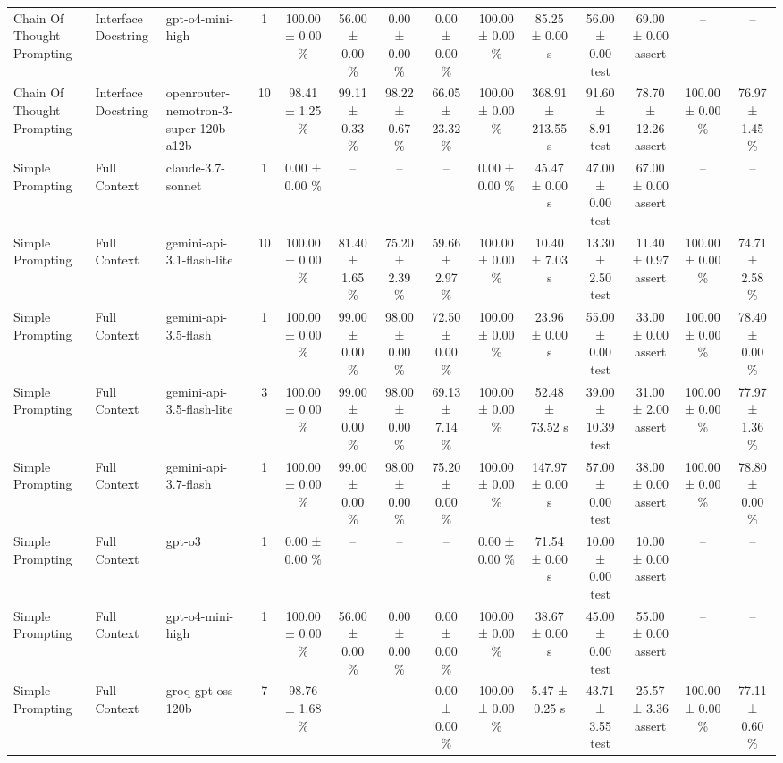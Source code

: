 \begin{table}[htbp]
\begin{tabular}{lllccccccccccc}
Chain Of Thought Prompting & Interface Docstring & gpt-o4-mini-high & 1 & 100.00 ± 0.00 \% & 56.00 ± 0.00 \% & 0.00 ± 0.00 \% & 0.00 ± 0.00 \% & 100.00 ± 0.00 \% & 85.25 ± 0.00 s & 56.00 ± 0.00 test & 69.00 ± 0.00 assert & – & – \\
Chain Of Thought Prompting & Interface Docstring & openrouter-nemotron-3-super-120b-a12b & 10 & 98.41 ± 1.25 \% & 99.11 ± 0.33 \% & 98.22 ± 0.67 \% & 66.05 ± 23.32 \% & 100.00 ± 0.00 \% & 368.91 ± 213.55 s & 91.60 ± 8.91 test & 78.70 ± 12.26 assert & 100.00 ± 0.00 \% & 76.97 ± 1.45 \% \\
Simple Prompting & Full Context & claude-3.7-sonnet & 1 & 0.00 ± 0.00 \% & – & – & – & 0.00 ± 0.00 \% & 45.47 ± 0.00 s & 47.00 ± 0.00 test & 67.00 ± 0.00 assert & – & – \\
Simple Prompting & Full Context & gemini-api-3.1-flash-lite & 10 & 100.00 ± 0.00 \% & 81.40 ± 1.65 \% & 75.20 ± 2.39 \% & 59.66 ± 2.97 \% & 100.00 ± 0.00 \% & 10.40 ± 7.03 s & 13.30 ± 2.50 test & 11.40 ± 0.97 assert & 100.00 ± 0.00 \% & 74.71 ± 2.58 \% \\
Simple Prompting & Full Context & gemini-api-3.5-flash & 1 & 100.00 ± 0.00 \% & 99.00 ± 0.00 \% & 98.00 ± 0.00 \% & 72.50 ± 0.00 \% & 100.00 ± 0.00 \% & 23.96 ± 0.00 s & 55.00 ± 0.00 test & 33.00 ± 0.00 assert & 100.00 ± 0.00 \% & 78.40 ± 0.00 \% \\
Simple Prompting & Full Context & gemini-api-3.5-flash-lite & 3 & 100.00 ± 0.00 \% & 99.00 ± 0.00 \% & 98.00 ± 0.00 \% & 69.13 ± 7.14 \% & 100.00 ± 0.00 \% & 52.48 ± 73.52 s & 39.00 ± 10.39 test & 31.00 ± 2.00 assert & 100.00 ± 0.00 \% & 77.97 ± 1.36 \% \\
Simple Prompting & Full Context & gemini-api-3.7-flash & 1 & 100.00 ± 0.00 \% & 99.00 ± 0.00 \% & 98.00 ± 0.00 \% & 75.20 ± 0.00 \% & 100.00 ± 0.00 \% & 147.97 ± 0.00 s & 57.00 ± 0.00 test & 38.00 ± 0.00 assert & 100.00 ± 0.00 \% & 78.80 ± 0.00 \% \\
Simple Prompting & Full Context & gpt-o3 & 1 & 0.00 ± 0.00 \% & – & – & – & 0.00 ± 0.00 \% & 71.54 ± 0.00 s & 10.00 ± 0.00 test & 10.00 ± 0.00 assert & – & – \\
Simple Prompting & Full Context & gpt-o4-mini-high & 1 & 100.00 ± 0.00 \% & 56.00 ± 0.00 \% & 0.00 ± 0.00 \% & 0.00 ± 0.00 \% & 100.00 ± 0.00 \% & 38.67 ± 0.00 s & 45.00 ± 0.00 test & 55.00 ± 0.00 assert & – & – \\
Simple Prompting & Full Context & groq-gpt-oss-120b & 7 & 98.76 ± 1.68 \% & – & – & 0.00 ± 0.00 \% & 100.00 ± 0.00 \% & 5.47 ± 0.25 s & 43.71 ± 3.55 test & 25.57 ± 3.36 assert & 100.00 ± 0.00 \% & 77.11 ± 0.60 \% \\

\end{tabular}
\end{table}
